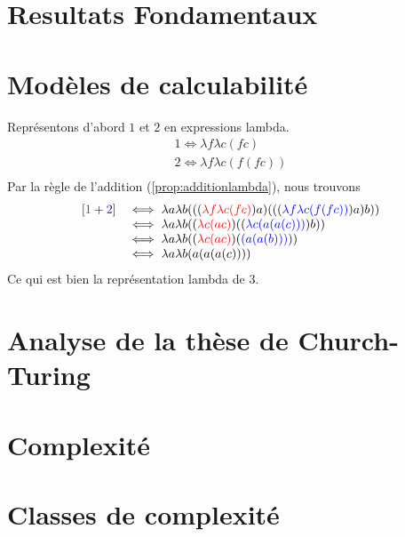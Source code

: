 \section{Resultats Fondamentaux}




\section{Modèles de calculabilité}

Représentons d'abord \(1\) et \(2\) en expressions lambda.
$$\begin{array}{ll}
	1 \iff \lambda f \lambda c (fc)\\
	2 \iff \lambda f \lambda c (f(fc))\\
\end{array}$$
Par la règle de l'addition (\ref{prop:additionlambda}), nous trouvons
$$\begin{array}{ll}
	[\textcolor{red}{1}+\textcolor{blue}{2}] & \iff \lambda a \lambda b ( ( ( \textcolor{red}{\lambda f \lambda c (fc)} )a ) ( ( ( \textcolor{blue}{\lambda f \lambda c (f(fc))})a)b) ) \\
	& \iff \lambda a \lambda b ((\textcolor{red}{\lambda c (a c)}) ((\textcolor{blue}{\lambda c (a(a(c)))})b)) \\
	& \iff \lambda a \lambda b ((\textcolor{red}{\lambda c (a c)}) (\textcolor{blue}{(a(a(b)))}))\\
	& \iff \lambda a \lambda b (a(a(a(c))))
\end{array}$$
Ce qui est bien la représentation lambda de \(3\).
\section{Analyse de la thèse de Church-Turing}




\section{Complexité}




\section{Classes de complexité}

